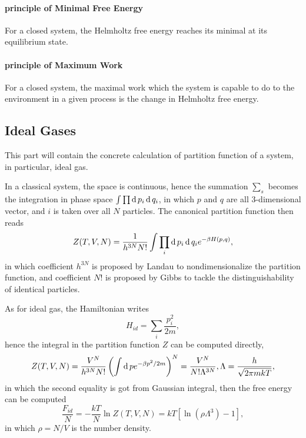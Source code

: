 \paragraph{principle of Minimal Free Energy}
For a closed system, the Helmholtz free energy reaches its minimal at its equilibrium state.
\paragraph{principle of Maximum Work}
For a closed system, the maximal work which the system is capable to do to the environment in a given process is the change in Helmholtz free energy.

\subsection{Ideal Gases}
This part will contain the concrete calculation of partition function of a system, in particular, ideal gas.

In a classical system, the space is continuous, hence the summation $\sum_s$ becomes the integration in phase space $\int\prod\operatorname{d}p_i\operatorname{d}q_i$, in which $p$ and $q$ are all $3$-dimensional vector, and $i$ is taken over all $N$ particles. The canonical partition function then reads
\begin{equation}
	Z(T,V,N) = \frac{1}{h^{3N}N!}\int \prod_i\operatorname{d}p_i\operatorname{d}q_i e^{-\beta H(p,q)},
\end{equation}
in which coefficient $h^{3N}$ is proposed by Landau to nondimensionalize the partition function, and coefficient $N!$ is proposed by Gibbs to tackle the distinguishability of identical particles.

As for ideal gas, the Hamiltonian writes
\begin{equation}
	H_{id}=\sum_i \frac{p_i^2}{2m},
\end{equation}
hence the integral in the partition function $Z$ can be computed directly,
\begin{equation}
	Z(T,V,N) = \frac{V^N}{h^{3N}N!}\left(\int\operatorname{d}pe^{-\beta p^2/2m}\right)^N = \frac{V^N}{N!\Lambda^{3N}}, \Lambda = \frac{h}{\sqrt{2\pi m kT}},
\end{equation}
in which the second equality is got from Gaussian integral, then the free energy can be computed
\begin{equation}
	\frac{F_{id}}{N}=-\frac{kT}{N}\ln Z(T,V,N) = kT\left[\ln (\rho\Lambda^3) - 1\right],
\end{equation}
in which $\rho = N/V$ is the number density.

